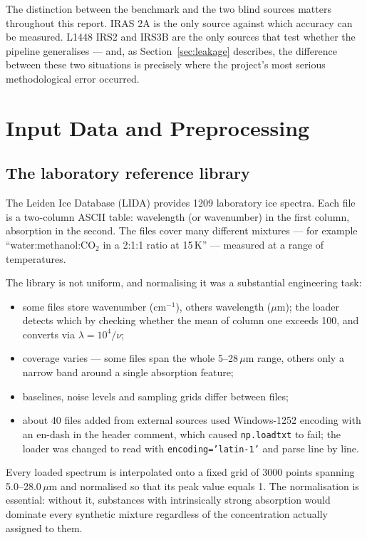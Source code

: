 \documentclass[11pt,a4paper]{article}
\newcommand{\um}{\,$\mu$m}
\newcommand{\code}[1]{\texttt{\small #1}}
\begin{document}
The distinction between the benchmark and the two blind sources matters
throughout this report. IRAS 2A is the only source against which accuracy
can be measured. L1448 IRS2 and IRS3B are the only sources that test
whether the pipeline generalises --- and, as Section~\ref{sec:leakage}
describes, the difference between these two situations is precisely where
the project's most serious methodological error occurred.

\section{Input Data and Preprocessing}

\subsection{The laboratory reference library}

The Leiden Ice Database (LIDA) provides 1209 laboratory ice spectra. Each
file is a two-column ASCII table: wavelength (or wavenumber) in the first
column, absorption in the second. The files cover many different mixtures
--- for example ``water:methanol:CO$_2$ in a 2:1:1 ratio at 15\,K'' ---
measured at a range of temperatures.

The library is not uniform, and normalising it was a substantial
engineering task:

\begin{itemize}
  \item some files store wavenumber (cm$^{-1}$), others wavelength
        ($\mu$m); the loader detects which by checking whether the mean of
        column one exceeds 100, and converts via $\lambda = 10^4/\nu$;
  \item coverage varies --- some files span the whole 5--28\um{} range,
        others only a narrow band around a single absorption feature;
  \item baselines, noise levels and sampling grids differ between files;
  \item about 40 files added from external sources used Windows-1252
        encoding with an en-dash in the header comment, which caused
        \code{np.loadtxt} to fail; the loader was changed to read with
        \code{encoding='latin-1'} and parse line by line.
\end{itemize}

Every loaded spectrum is interpolated onto a fixed grid of 3000 points
spanning 5.0--28.0\um{} and normalised so that its peak value equals 1.
The normalisation is essential: without it, substances with intrinsically
strong absorption would dominate every synthetic mixture regardless of the
concentration actually assigned to them.
\end{document}
